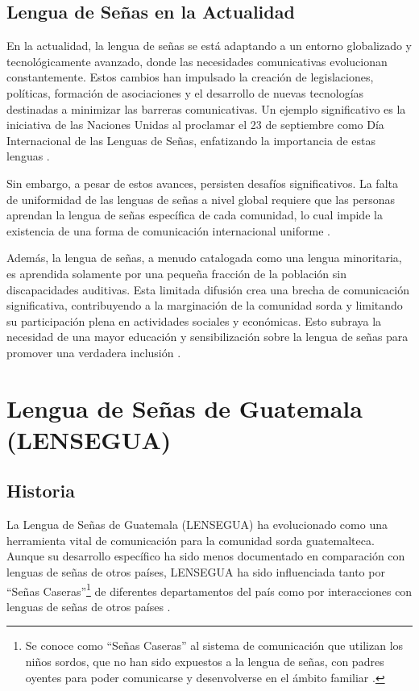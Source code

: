 \subsection{Lengua de Señas en la Actualidad}
En la actualidad, la lengua de señas se está adaptando a un entorno globalizado y tecnológicamente avanzado, donde las necesidades comunicativas evolucionan constantemente. Estos cambios han impulsado la creación de legislaciones, políticas, formación de asociaciones y el desarrollo de nuevas tecnologías destinadas a minimizar las barreras comunicativas. Un ejemplo significativo es la iniciativa de las Naciones Unidas al proclamar el 23 de septiembre como Día Internacional de las Lenguas de Señas, enfatizando la importancia de estas lenguas \cite{Parada2022}.

Sin embargo, a pesar de estos avances, persisten desafíos significativos. La falta de uniformidad de las lenguas de señas a nivel global requiere que las personas aprendan la lengua de señas específica de cada comunidad, lo cual impide la existencia de una forma de comunicación internacional uniforme \cite{RuizVilla2022}.

Además, la lengua de señas, a menudo catalogada como una lengua minoritaria, es aprendida solamente por una pequeña fracción de la población sin discapacidades auditivas. Esta limitada difusión crea una brecha de comunicación significativa, contribuyendo a la marginación de la comunidad sorda y limitando su participación plena en actividades sociales y económicas. Esto subraya la necesidad de una mayor educación y sensibilización sobre la lengua de señas para promover una verdadera inclusión \cite{MelendezLabrador2021}.

\section{Lengua de Señas de Guatemala (LENSEGUA)}

\subsection{Historia}
La Lengua de Señas de Guatemala (LENSEGUA) ha evolucionado como una herramienta vital de comunicación para la comunidad sorda guatemalteca. Aunque su desarrollo específico ha sido menos documentado en comparación con lenguas de señas de otros países, LENSEGUA ha sido influenciada tanto por ``Señas Caseras''\footnote{Se conoce como ``Señas Caseras'' al sistema de comunicación que utilizan los niños sordos, que no han sido expuestos a la lengua de señas, con padres oyentes para poder comunicarse y desenvolverse en el ámbito familiar \cite{EnSenasCultura}.} de diferentes departamentos del país como por interacciones con lenguas de señas de otros países \cite{Aroche2022} \cite{EndangeredLanguages}.


